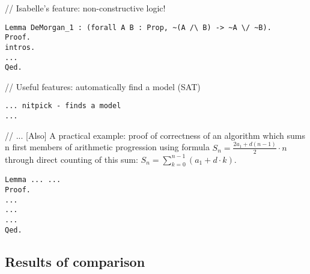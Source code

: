 \documentclass[article]{aaltoseries}
\begin{document}
// Isabelle's feature: non-constructive logic!
\begin{lstlisting}[caption={Propositional logic proof to the contrary}]
Lemma DeMorgan_1 : (forall A B : Prop, ~(A /\ B) -> ~A \/ ~B).
Proof.
intros.
...
Qed.
\end{lstlisting}

// Useful features: automatically find a model (SAT)
\begin{lstlisting}[caption={Isabelle as an SAT solver}]
... nitpick - finds a model
...
\end{lstlisting}





// ... [Also] A practical example: proof of correctness of an algorithm which sums n first members of arithmetic progression using formula $S_{n} = { {\frac {2 a_{1} + d (n - 1)}{2} \cdot n}}$ through direct counting of this sum: $S_{n} = \sum\limits_{k=0}^{n-1} (a_{1} + d \cdot k)$.
\begin{lstlisting}[caption={First-order logic proof: formula of the sum of n first members of arithmetic progression}]
Lemma ... ... 
Proof.
...
...
...
Qed.
\end{lstlisting}







\subsection{Results of comparison}
\label{sec:joint_comparison}
\end{document}
